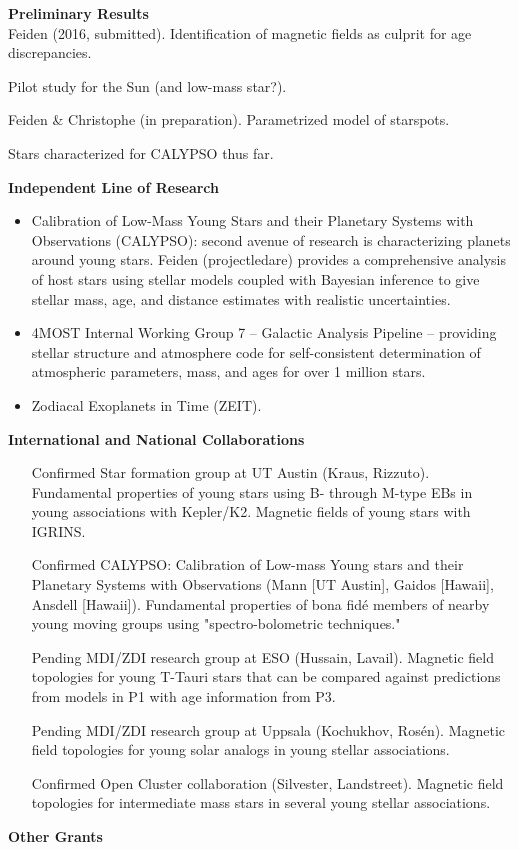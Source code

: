 \documentclass[12pt,a4paper]{article}
\begin{document}
{\bf \large Preliminary Results} \\
Feiden (2016, submitted). Identification of magnetic fields as culprit for age discrepancies.

Pilot study for the Sun (and low-mass star?).

Feiden \& Christophe (in preparation). Parametrized model of starspots.

Stars characterized for CALYPSO thus far.

{\bf \large Independent Line of Research}
\begin{itemize}
	\item Calibration of Low-Mass Young Stars and their Planetary Systems with Observations (CALYPSO): 
	second avenue of research is characterizing planets around young stars. 
    Feiden (projectledare) provides a comprehensive analysis of host stars using stellar models coupled 
    with Bayesian inference
    to give stellar mass, age, and distance estimates with realistic uncertainties.
	\item 4MOST Internal Working Group 7 -- Galactic Analysis Pipeline -- providing stellar
    structure and atmosphere code for self-consistent determination of atmospheric 
    parameters, mass, and ages for over 1 million stars.
    \item Zodiacal Exoplanets in Time (ZEIT).
\end{itemize}

{\bf \large International and National Collaborations}
\begin{itemize}
  	\item [Confirmed] Star formation group at UT Austin (Kraus, Rizzuto). Fundamental properties of young stars using B- through M-type EBs in young associations with Kepler/K2. Magnetic fields of young stars with IGRINS.
  	\item [Confirmed] CALYPSO: Calibration of Low-mass Young stars and their Planetary Systems with Observations (Mann [UT Austin], Gaidos [Hawaii], Ansdell [Hawaii]). Fundamental properties of bona fid\'{e} members of nearby young moving groups using "spectro-bolometric techniques."
  	\item [Pending] MDI/ZDI research group at ESO (Hussain, Lavail). Magnetic field topologies for young T-Tauri stars that can be compared against predictions from models in P1 with age information from P3.
  	\item [Pending] MDI/ZDI research group at Uppsala (Kochukhov, Ros\'{e}n). Magnetic field topologies for young solar analogs in young stellar associations.
  	\item [Confirmed] Open Cluster collaboration (Silvester, Landstreet). Magnetic field topologies for intermediate mass stars in several young stellar associations.
\end{itemize}


{\bf \large Other Grants}


\end{document}
